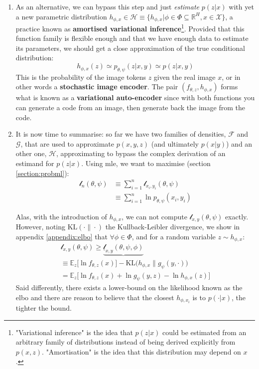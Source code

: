 \documentclass{article}
\begin{document}
\begin{multicols}{2}
\begin{enumerate}
    \item As an alternative, we can bypass this step and just \textit{estimate} $p(z|x)$ with yet a new parametric distribution $h_{\phi,x}\in \mathcal{H}\equiv \{h_{\phi,x}|\phi\in\Phi\subseteq\mathbb{R}^{H},x\in\mathcal{X}\}$, a practice known as \textbf{amortised variational inference}\footnote{"Variational inference" is the idea that $p(z|x)$ could be estimated from an arbitrary family of distributions instead of being derived explicitly from $p(x,z)$. "Amortisation" is the idea that this distribution may depend on $x$.}. Provided that this function family is flexible enough and that we have enough data to estimate its parameters, we should get a close approximation of the true conditional distribution:
    $$h_{\phi,x}(z)\simeq p_{\theta,\psi}(z|x,y)\simeq p(z|x,y)$$
    This is the probability of the image tokens $z$ given the real image $x$, or in other words a \textbf{stochastic image encoder}. The pair $(f_{\theta,z}, h_{\phi,x})$ forms what is known as a \textbf{variational auto-encoder} since with both functions you can generate a code from an image, then generate back the image from the code.
    
    \item It is now time to summarise: so far we have two families of densities, $\mathcal{F}$ and $\mathcal{G}$, that are used to approximate $p(x,y,z)$ (and ultimately $p(x|y)$) and an other one, $\mathcal{H}$, approximating to bypass the complex derivation of an estimand for $p(z|x)$. Using \gls{mle}, we want to maximise (section \ref{section:probml}): \begin{align*}\mathscr{l}_n(\theta,\psi) & \equiv \sum_{i=1}^n \mathscr{l}_{x_i,y_i}(\theta,\psi) \\ & \equiv \sum_{i=1}^n \ln p_{\theta,\psi}(x_i,y_i)\end{align*}
    
    Alas, with the introduction of $h_{\phi,x}$, we can not compute $\mathscr{l}_{x,y}(\theta,\psi)$ exactly. However, noting $\textrm{KL}(\cdot \| \cdot )$ the Kullback-Leibler divergence, we show in appendix \ref{appendix:elbo} that $\forall \phi \in \Phi$, and for a random variable $z\sim h_{\phi,x}$:
    \begin{align} \label{eq:elb_ours}
    \mathscr{l}_{x,y}(\theta,\psi) \geqslant \underbrace{\underline{\mathscr{l}}_{x,y}(\theta,\psi,\phi)}{} \\ \equiv \mathbb{E}_z \Big[\ln f_{\theta,z}(x)\Big] - \textrm{KL}\Big( h_{\phi,x} \| g_\psi(y,\cdot) \Big) \\ =\mathbb{E}_z \Big[\ln f_{\theta,z}(x)+\ln g_\psi(y,z) -\ln h_{\phi,x}(z)\Big]
    \end{align}
    Said differently, there exists a lower-bound on the likelihood known as the \gls{elbo} and there are reason to believe that the closest $h_{\phi,x_i}$ is to $p(\cdot|x)$, the tighter the bound. %
    

\end{enumerate}
\end{multicols}
\end{document}
